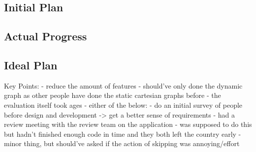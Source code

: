\subsection{Initial Plan}

\subsection{Actual Progress}

\subsection{Ideal Plan}

Key Points:
- reduce the amount of features
    - should've only done the dynamic graph as other people have done the static cartesian graphs before
    - the evaluation itself took ages 
- either of the below:
    - do an initial survey of people before design and development -> get a better sense of requirements
    - had a review meeting with the review team on the application - was supposed to do this but hadn't finished enough code in time and they both left the country early
    - minor thing, but should've asked if the action of skipping was annoying/effort